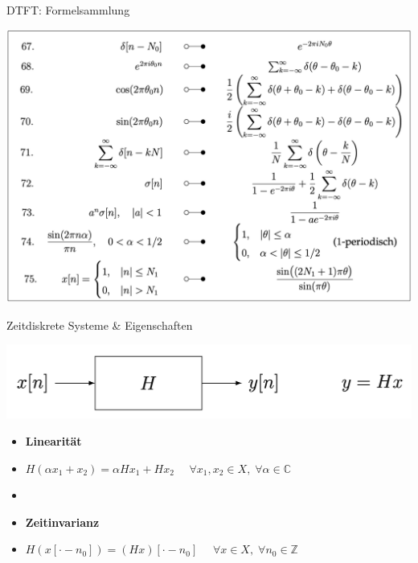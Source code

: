 \documentclass[14pt, aspectratio=169, handout]{beamer}
\begin{document}
\begin{frame}{DTFT: Formelsammlung}
    \begin{center}
        \includegraphics[width=0.7\linewidth]{figures/DTFT_paare.png}
    \end{center}
\end{frame}

\begin{frame}{Zeitdiskrete Systeme \& Eigenschaften}
    \vspace*{-0.25cm}
    \begin{center}
        \includegraphics[width=0.6\linewidth]{figures/System_zeitdiskret.png}
    \end{center}
    \begin{itemize}
    \item \textbf{Linearität}
    \item[] $H(\alpha x_1 + x_2) = \alpha H x_1 + H x_2 \hspace{16pt} \forall x_1, x_2 \in X, \; \forall \alpha \in \mathbb{C}$
    \item[]
    \item \textbf{Zeitinvarianz}
    \item[] $H(x[\cdot -n_0]) = (Hx)[\cdot -n_0] \hspace{16pt} \forall x\in X, \; \forall n_0 \in \mathbb{Z}$
\end{itemize}
\end{frame}
\end{document}
